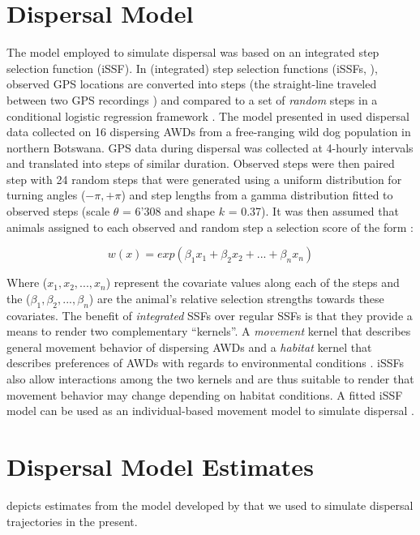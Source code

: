 \documentclass[abstract=on,10pt,a4paper,bibliography=totocnumbered]{article}
\begin{document}
\section{Dispersal Model}
The model employed to simulate dispersal was based on an integrated step
selection function (iSSF). In (integrated) step selection functions (iSSFs,
\citealp{Fortin.2005, Avgar.2016}), observed GPS locations are converted into
steps (the straight-line traveled between two GPS recordings
\citep{Turchin.1998}) and compared to a set of \textit{random} steps in a
conditional logistic regression framework \citep{Fortin.2005, Thurfjell.2014,
Muff.2020, Fieberg.2021}. The model presented in \citep{Hofmann.2023} used
dispersal data collected on 16 dispersing AWDs from a free-ranging wild dog
population in northern Botswana. GPS data during dispersal was collected at
4-hourly intervals and translated into steps of similar duration. Observed steps
were then paired step with 24 random steps that were generated using a uniform
distribution for turning angles (\(-\pi, +\pi\)) and step lengths from a gamma
distribution fitted to observed steps (scale \(\theta\) = 6'308 and shape \(k\)
= 0.37). It was then assumed that animals assigned to each observed and random
step a selection score of the form \citep{Fortin.2005}:

\begin{equation}
\label{EQ1}
  w(x) = exp(\beta_1 x_1 + \beta_2 x_2 + ... + \beta_n x_n)
\end{equation}

Where (\(x_1, x_2, ..., x_n\)) represent the covariate values along each of the
steps and the (\(\beta_1, \beta_2, ..., \beta_n\)) are the animal's relative
selection strengths \citep{Avgar.2017} towards these covariates. The benefit
of \textit{integrated} SSFs over regular SSFs is that they provide a means to
render two complementary ``kernels''. A \textit{movement} kernel that describes
general movement behavior of dispersing AWDs and a \textit{habitat} kernel that
describes preferences of AWDs with regards to environmental conditions
\citep{Fieberg.2021}. iSSFs also allow interactions among the two kernels and
are thus suitable to render that movement behavior may change depending on
habitat conditions. A fitted iSSF model can be used as an individual-based
movement model to simulate dispersal \citep{Signer.2017, Hofmann.2023}.

\newpage
\section{Dispersal Model Estimates}
 depicts estimates from the model developed by \citet{Hofmann.2023}
that we used to simulate dispersal trajectories in the present.
\end{document}
